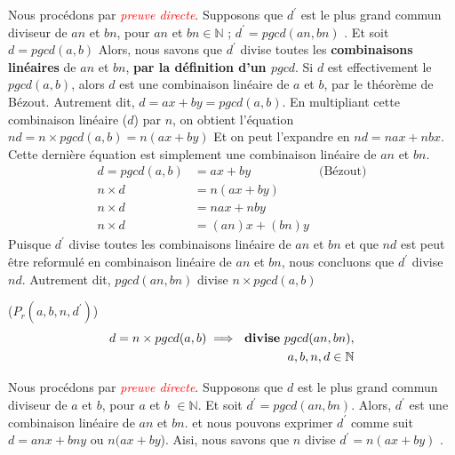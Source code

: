 \documentclass[16pt]{report}
\begin{document}
\begin{multicols*}{2}
    \begin{Preuve*}{}{}
        Nous procédons par \textcolor{red}{\textit{preuve directe}}. Supposons que $d^{\prime}$ est le 
        plus grand commun diviseur de $an$ et $bn$, pour $an$ et $bn \in \mathbb{N}$ ; $d^{\prime} = pgcd(an, bn)$ 
        . Et soit $d = pgcd(a,b)$ Alors, nous savons que \textcolor{myb}{$d^{\prime}$ divise toutes les 
        \textbf{combinaisons linéaires} de $an$ et $bn$}, \textbf{par la définition d'un $pgcd$}.
        Si $d$ est effectivement le $pgcd(a,b)$, alors $d$ est une combinaison linéaire de $a$ et $b$, 
        par le théorème de Bézout. Autrement dit, $d = ax + by = pgcd(a,b)$. En multipliant 
        cette combinaison linéaire ($d$) par $n$, on obtient l'équation $nd = n \times pgcd(a,b) = n(ax + by)$
        Et on peut l'expandre en \textcolor{myb}{$nd = nax + nbx$}. Cette dernière équation est simplement 
        une combinaison linéaire de $an$ et $bn$. 
        \begin{align*}
            d = pgcd(a,b) &= ax + by &\text{(Bézout)} \\ 
            n \times d &=  n(ax + by) \\ 
            n \times d &= nax + nby \\
            n \times d &= (an)x + (bn)y 
        \end{align*}
        Puisque $d^{\prime}$ divise toutes les combinaisons linéaire de $an$ et $bn$ et que 
        $nd$ est peut être reformulé en combinaison linéaire de $an$ et $bn$, nous concluons que 
        $d^{\prime}$ divise $nd$. Autrement dit, $pgcd(an ,bn)$ divise $n \times pgcd(a,b)$ 
    \end{Preuve*}

    \begin{prop}{($P_r(a,b, n, d^{\prime})$)}{}
    \begin{align*}
             d = n \times pgcd(a, b) \implies \text{ \textbf{divise} } pgcd(an, bn),
             \\ a, b, n, d \in \mathbb{N} 
    \end{align*}       
    \end{prop}


    \begin{Preuve*}{}{}
        Nous procédons par \textcolor{red}{\textit{preuve directe}}. Supposons que  $d$ est le 
        plus grand commun diviseur de $a$ et $b$, pour $a$ et $b$ $\in \mathbb{N}$. Et soit 
        $d^{\prime} = pgcd(an, bn)$. Alors, $d^{\prime}$ est une combinaison linéaire de 
        $an$ et $bn$. 
        et nous pouvons exprimer $d^{\prime}$ comme suit  $ d = anx + bny$ ou 
        \textcolor{myp}{$n(ax + by$)}.  Aisi, nous savons que $n$ divise $d^{\prime} = n(ax + by)$ \vspace{1em}. \\ 


\end{Preuve*}
\end{multicols*}
\end{document}
